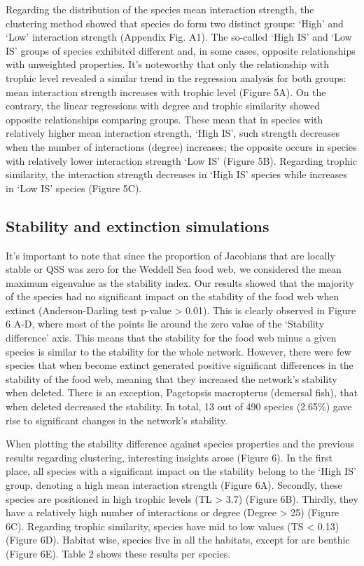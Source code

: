 \documentclass[gc, manuscript]{copernicus}
\begin{document}
Regarding the distribution of the species mean interaction strength, the
clustering method showed that species do form two distinct groups:
`High' and `Low' interaction strength (Appendix Fig. A1). The so-called
`High IS' and `Low IS' groups of species exhibited different and, in
some cases, opposite relationships with unweighted properties. It's
noteworthy that only the relationship with trophic level revealed a
similar trend in the regression analysis for both groups: mean
interaction strength increases with trophic level (Figure 5A). On the
contrary, the linear regressions with degree and trophic similarity
showed opposite relationships comparing groups. These mean that in
species with relatively higher mean interaction strength, `High IS',
such strength decreases when the number of interactions (degree)
increases; the opposite occurs in species with relatively lower
interaction strength `Low IS' (Figure 5B). Regarding trophic similarity,
the interaction strength decreases in `High IS' species while increases
in `Low IS' species (Figure 5C).

\subsection{Stability and extinction simulations}

It's important to note that since the proportion of Jacobians that are
locally stable or QSS was zero for the Weddell Sea food web, we
considered the mean maximum eigenvalue as the stability index. Our
results showed that the majority of the species had no significant
impact on the stability of the food web when extinct (Anderson-Darling
test p-value \textgreater{} 0.01). This is clearly observed in Figure 6
A-D, where most of the points lie around the zero value of the
`Stability difference' axis. This means that the stability for the food
web minus a given species is similar to the stability for the whole
network. However, there were few species that when become extinct
generated positive significant differences in the stability of the food
web, meaning that they increased the network's stability when deleted.
There is an exception, Pagetopsis macropterus (demersal fish), that when
deleted decreased the stability. In total, 13 out of 490 species
(2.65\%) gave rise to significant changes in the network's stability.

When plotting the stability difference against species properties and
the previous results regarding clustering, interesting insights arose
(Figure 6). In the first place, all species with a significant impact on
the stability belong to the `High IS' group, denoting a high mean
interaction strength (Figure 6A). Secondly, these species are positioned
in high trophic levels (TL \textgreater{} 3.7) (Figure 6B). Thirdly,
they have a relatively high number of interactions or degree (Degree
\textgreater{} 25) (Figure 6C). Regarding trophic similarity, species
have mid to low values (TS \textless{} 0.13) (Figure 6D). Habitat wise,
species live in all the habitats, except for are benthic (Figure 6E).
Table 2 shows these results per species.
\end{document}
